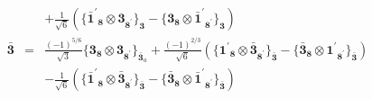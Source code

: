 \documentclass[english]{article}
\newcommand{\subcg}[3]{\big\{ {#1}\otimes{#2}\big\}^{}_{#3}}
\newcommand{\rep}[1]{\mathbf{#1}}
\begin{document}
\begin{itemize}
\begin{eqnarray*}
 & & +\frac{1}{\sqrt{6}}\left(\subcg{\rep{\bar{1}^{\prime}}_{\rep{8}}}{\rep{3}_{\rep{8^{\prime}}}}{\rep{3}}-\subcg{\rep{3}_{\rep{8}}}{\rep{\bar{1}^{\prime}}_{\rep{8^{\prime}}}}{\rep{3}}\right)
\\
\rep{\bar{3}} &=& \frac{(-1)^{5/6}}{\sqrt{3}}\subcg{\rep{3}_{\rep{8}}}{\rep{3}_{\rep{8^{\prime}}}}{\rep{\bar{3}}_{a}}+\frac{(-1)^{2/3}}{\sqrt{6}}\left(\subcg{\rep{1^{\prime}}_{\rep{8}}}{\rep{\bar{3}}_{\rep{8^{\prime}}}}{\rep{\bar{3}}}-\subcg{\rep{\bar{3}}_{\rep{8}}}{\rep{1^{\prime}}_{\rep{8^{\prime}}}}{\rep{\bar{3}}}\right) \\ 
 & & -\frac{1}{\sqrt{6}}\left(\subcg{\rep{\bar{1}^{\prime}}_{\rep{8}}}{\rep{\bar{3}}_{\rep{8^{\prime}}}}{\rep{\bar{3}}}-\subcg{\rep{\bar{3}}_{\rep{8}}}{\rep{\bar{1}^{\prime}}_{\rep{8^{\prime}}}}{\rep{\bar{3}}}\right)
\end{eqnarray*}
\end{itemize}
\end{document}
